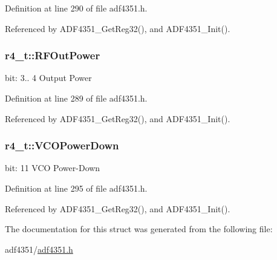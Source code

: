 Definition at line 290 of file adf4351.\+h.



Referenced by A\+D\+F4351\+\_\+\+Get\+Reg32(), and A\+D\+F4351\+\_\+\+Init().

\subsubsection[{\texorpdfstring{R\+F\+Out\+Power}{RFOutPower}}]{ r4\+\_\+t\+::\+R\+F\+Out\+Power}\hypertarget{structr4__t_ade4ee7f86064dd89515558dc5aa138bd}{}\label{structr4__t_ade4ee7f86064dd89515558dc5aa138bd}
bit\+: 3.. 4 Output Power 

Definition at line 289 of file adf4351.\+h.



Referenced by A\+D\+F4351\+\_\+\+Get\+Reg32(), and A\+D\+F4351\+\_\+\+Init().

\subsubsection[{\texorpdfstring{V\+C\+O\+Power\+Down}{VCOPowerDown}}]{ r4\+\_\+t\+::\+V\+C\+O\+Power\+Down}\hypertarget{structr4__t_a144b348686f74ef9a401f2c57f324824}{}\label{structr4__t_a144b348686f74ef9a401f2c57f324824}
bit\+: 11 V\+CO Power-\/\+Down 

Definition at line 295 of file adf4351.\+h.



Referenced by A\+D\+F4351\+\_\+\+Get\+Reg32(), and A\+D\+F4351\+\_\+\+Init().



The documentation for this struct was generated from the following file\+:\begin{DoxyCompactItemize}
\item 
adf4351/\hyperlink{adf4351_8h}{adf4351.\+h}\end{DoxyCompactItemize}
